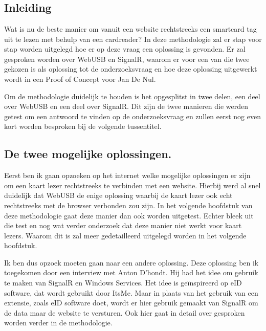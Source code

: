 \graphicspath{{graphics/}}
\chapter{}%
\label{ch:methodologie}

\section{Inleiding}
Wat is nu de beste manier om vanuit een website rechtstreeks een smartcard tag uit te lezen met behulp van een cardreader? In deze methodologie zal er stap voor stap worden uitgelegd hoe er op deze vraag een oplossing is gevonden. Er zal gesproken worden over WebUSB en SignalR, waarom er voor een van die twee gekozen is als oplossing tot de onderzoeksvraag en hoe deze oplossing uitgewerkt wordt in een Proof of Concept voor Jan De Nul. 

Om de methodologie duidelijk te houden is het opgesplitst in twee delen, een deel over WebUSB en een deel over SignalR. Dit zijn de twee manieren die werden getest om een antwoord te vinden op de onderzoeksvraag en zullen eerst nog even kort worden besproken bij de volgende tussentitel. 


\section{De twee mogelijke oplossingen. }
Eerst ben ik gaan opzoeken op het internet welke mogelijke oplossingen er zijn om een kaart lezer rechtstreeks te verbinden met een website. Hierbij werd al snel duidelijk dat WebUSB de enige oplossing waarbij de kaart lezer ook echt rechtstreeks met de browser verbonden zou zijn. In het volgende hoofdstuk van deze methodologie gaat deze manier dan ook worden uitgetest. Echter bleek uit die test en nog wat verder onderzoek dat deze manier niet werkt voor kaart lezers. Waarom dit is zal meer gedetailleerd uitgelegd worden in het volgende hoofdstuk. 

Ik ben dus opzoek moeten gaan naar een andere oplossing. Deze oplossing ben ik toegekomen door een interview met Anton D’hondt. Hij had het idee om gebruik te maken van SignalR en Windows Services. Het idee is geïnspireerd op eID software, dat wordt gebruikt door ItsMe. Maar in plaats van het gebruik van een extensie, zoals eID software doet, wordt er hier gebruik gemaakt van SignalR om de data maar de website te versturen. Ook hier gaat in detail over gesproken worden verder in de methodologie. 



